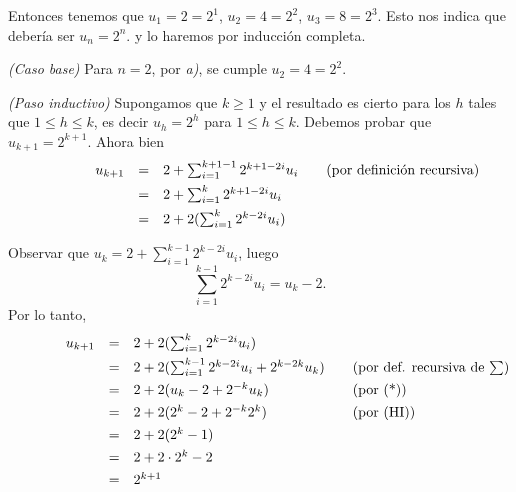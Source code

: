 \documentclass[a4paper,12pt,twoside,spanish,reqno]{amsbook}
\numberwithin{equation}{section}
\begin{document}
\begin{enumerate}
\begin{enumerate}
            Entonces tenemos que $u_1 = 2 = 2^1$, $u_2 = 4 = 2^2$, $u_3 = 8 = 2^3$. Esto nos indica que debería ser $u_n = 2^n$.  y lo haremos por inducción completa. 
            
            \textit{(Caso base) } Para $n=2$, por \textit{a)}, se cumple $u_2 = 4 =2^2$. 
            
            \textit{(Paso inductivo) } Supongamos que $k \ge 1$ y el resultado  es cierto para los $h$ tales que  $1 \le h \le k$,  es decir $u_h=2^h$ para $1 \le h \le k$. Debemos probar que $u_{k+1} = 2^{k+1}$. Ahora bien
            \begin{equation*}
            \qquad\qquad\begin{matrix}
            u_{k+1} &=& 2+\sum_{i=1}^{k+1-1}2^{k+1-2i}u_i \hfill &\quad \text{(por definición recursiva)} \hfill \\[4pt]
            &=& 2+\sum_{i=1}^{k}2^{k+1-2i}u_i \hfill &\hfill\\[4pt]
            &=& 2+2(\sum_{i=1}^{k}2^{k-2i}u_i) \hfill &\hfill\\[4pt]
            \end{matrix}
            \end{equation*}
            Observar  que  $u_k= 2+\sum_{i=1}^{k-1}2^{k-2i}u_i$, luego 
            \begin{equation*}
                \sum_{i=1}^{k-1}2^{k-2i}u_i = u_k -2. \tag{*}
            \end{equation*}
            Por lo tanto,
            \begin{equation*}
                \qquad\qquad\begin{matrix}
                u_{k+1} &=& 2+2(\sum_{i=1}^{k}2^{k-2i}u_i) \hfill &\hfill\\[4pt]
                &=& 2+2(\sum_{i=1}^{k-1}2^{k-2i}u_i + 2^{k-2k}u_k) \hfill &\quad \text{(por def. recursiva de $\sum$)} \\[4pt]
                &=& 2+2( u_k -2 + 2^{-k}u_k) \hfill &\quad \text{(por (*))}\hfill \\[4pt]
                &=& 2+2( 2^k -2 + 2^{-k}2^k) \hfill &\quad \text{(por (HI))}\hfill \\[4pt]
                &=& 2+2( 2^k -1) \hfill &\quad\hfill \\[4pt]
                &=& 2+2\cdot 2^k - 2 \hfill &\quad\hfill \\[4pt]
                &=& 2^{k+1} \hfill &\quad\hfill \\[4pt]
                \end{matrix}
                \end{equation*}
        \end{enumerate}


\end{enumerate}
\end{document}
